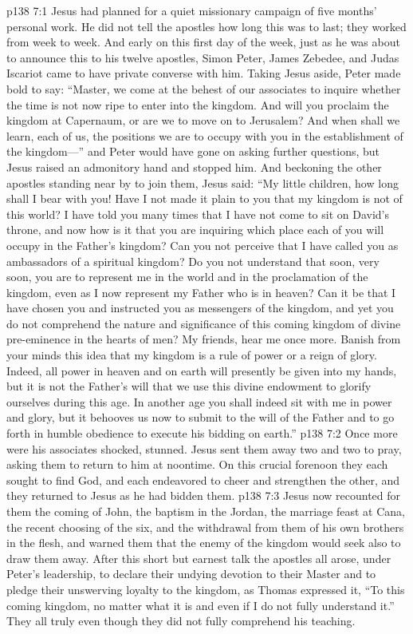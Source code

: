 \vs p138 7:1 Jesus had planned for a quiet missionary campaign of five months’ personal work. He did not tell the apostles how long this was to last; they worked from week to week. And early on this first day of the week, just as he was about to announce this to his twelve apostles, Simon Peter, James Zebedee, and Judas Iscariot came to have private converse with him. Taking Jesus aside, Peter made bold to say: “Master, we come at the behest of our associates to inquire whether the time is not now ripe to enter into the kingdom. And will you proclaim the kingdom at Capernaum, or are we to move on to Jerusalem? And when shall we learn, each of us, the positions we are to occupy with you in the establishment of the kingdom---” and Peter would have gone on asking further questions, but Jesus raised an admonitory hand and stopped him. And beckoning the other apostles standing near by to join them, Jesus said: \textcolor{ubdarkred}{“My little children, how long shall I bear with you! Have I not made it plain to you that my kingdom is not of this world? I have told you many times that I have not come to sit on David’s throne, and now how is it that you are inquiring which place each of you will occupy in the Father’s kingdom? Can you not perceive that I have called you as ambassadors of a spiritual kingdom? Do you not understand that soon, very soon, you are to represent me in the world and in the proclamation of the kingdom, even as I now represent my Father who is in heaven? Can it be that I have chosen you and instructed you as messengers of the kingdom, and yet you do not comprehend the nature and significance of this coming kingdom of divine pre\hyp{}eminence in the hearts of men? My friends, hear me once more. Banish from your minds this idea that my kingdom is a rule of power or a reign of glory. Indeed, all power in heaven and on earth will presently be given into my hands, but it is not the Father’s will that we use this divine endowment to glorify ourselves during this age. In another age you shall indeed sit with me in power and glory, but it behooves us now to submit to the will of the Father and to go forth in humble obedience to execute his bidding on earth.”}
\vs p138 7:2 Once more were his associates shocked, stunned. Jesus sent them away two and two to pray, asking them to return to him at noontime. On this crucial forenoon they each sought to find God, and each endeavored to cheer and strengthen the other, and they returned to Jesus as he had bidden them.
\vs p138 7:3 Jesus now recounted for them the coming of John, the baptism in the Jordan, the marriage feast at Cana, the recent choosing of the six, and the withdrawal from them of his own brothers in the flesh, and warned them that the enemy of the kingdom would seek also to draw them away. After this short but earnest talk the apostles all arose, under Peter’s leadership, to declare their undying devotion to their Master and to pledge their unswerving loyalty to the kingdom, as Thomas expressed it, “To this coming kingdom, no matter what it is and even if I do not fully understand it.” They all truly  even though they did not fully comprehend his teaching.

